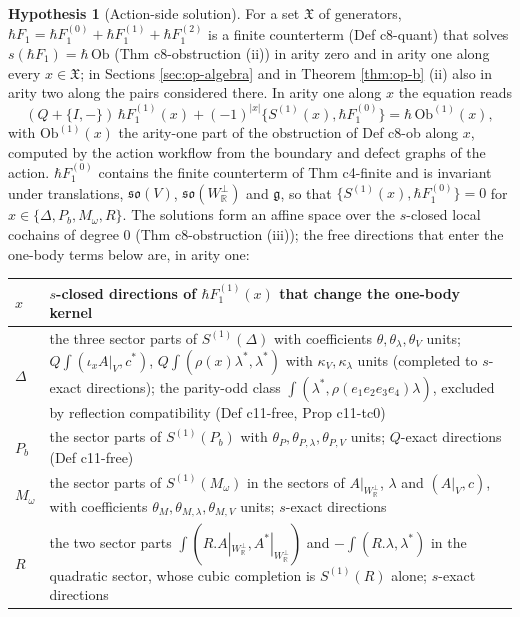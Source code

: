 \documentclass[11pt]{article}
\numberwithin{equation}{section}
\theoremstyle{plain}
\theoremstyle{definition}
\newtheorem{hypothesis}[theorem]{Hypothesis}
\newcommand{\Ap}{A|_{W_{\mathbb R}^\perp}}
\newcommand{\AV}{A|_V}
\begin{document}
\begin{hypothesis}[Action-side solution]
\label{hyp:op-A}
For a set $\mathfrak X$ of generators, $\hbar F_1=\hbar F_1^{(0)}+\hbar F_1^{(1)}+\hbar F_1^{(2)}$ is a finite counterterm (Def c8-quant) that solves $s(\hbar F_1)=\hbar\,\mathrm{Ob}$ (Thm c8-obstruction (ii)) in arity zero and in arity one along every $x\in\mathfrak X$; in Sections \ref{sec:op-algebra} and in Theorem \ref{thm:op-b} (ii) also in arity two along the pairs considered there. In arity one along $x$ the equation reads
\begin{equation}
(Q+\{I,-\})\,\hbar F_1^{(1)}(x)+(-1)^{|x|}\big\{S^{(1)}(x),\hbar F_1^{(0)}\big\}=\hbar\,\mathrm{Ob}^{(1)}(x),
\label{eq:op-arity1}
\end{equation}
with $\mathrm{Ob}^{(1)}(x)$ the arity-one part of the obstruction of Def c8-ob along $x$, computed by the action workflow from the boundary and defect graphs of the action. $\hbar F_1^{(0)}$ contains the finite counterterm of Thm c4-finite and is invariant under translations, $\mathfrak{so}(V)$, $\mathfrak{so}(W_{\mathbb R}^\perp)$ and $\mathfrak g$, so that $\{S^{(1)}(x),\hbar F_1^{(0)}\}=0$ for $x\in\{\Delta,P_b,M_\omega,R\}$. The solutions form an affine space over the $s$-closed local cochains of degree $0$ (Thm c8-obstruction (iii)); the free directions that enter the one-body terms below are, in arity one:
\begin{center}
\begin{tabular}{l|p{11.2cm}}
$x$ & $s$-closed directions of $\hbar F_1^{(1)}(x)$ that change the one-body kernel\\
\hline
$\Delta$ & the three sector parts of $S^{(1)}(\Delta)$ with coefficients $\theta,\theta_\lambda,\theta_V$ units; $Q\int(\iota_xA|_V,c^*)$, $Q\int(\rho(x)\lambda^*,\lambda^*)$ with $\kappa_V,\kappa_\lambda$ units (completed to $s$-exact directions); the parity-odd class $\int(\lambda^*,\rho(e_1e_2e_3e_4)\lambda)$, excluded by reflection compatibility (Def c11-free, Prop c11-tc0)\\
$P_b$ & the sector parts of $S^{(1)}(P_b)$ with $\theta_P,\theta_{P,\lambda},\theta_{P,V}$ units; $Q$-exact directions (Def c11-free)\\
$M_\omega$ & the sector parts of $S^{(1)}(M_\omega)$ in the sectors of $\Ap$, $\lambda$ and $(\AV,c)$, with coefficients $\theta_{M},\theta_{M,\lambda},\theta_{M,V}$ units; $s$-exact directions\\
$R$ & the two sector parts $\int(R.\Ap,A^*|_{W_{\mathbb R}^\perp})$ and $-\int(R.\lambda,\lambda^*)$ in the quadratic sector, whose cubic completion is $S^{(1)}(R)$ alone; $s$-exact directions\\

\end{tabular}
\end{center}
\end{hypothesis}
\end{document}
